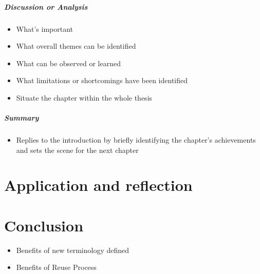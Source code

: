 \documentclass[dissertation]{softeng}
\begin{document}
\paragraph{Discussion or Analysis}
\begin{itemize}
\item What's important
\item What overall themes can be identified
\item What can be observed or learned
\item What limitations or shortcomings have been identified
\item Situate the chapter within the whole thesis
\end{itemize}
\paragraph{Summary}
\begin{itemize}
\item Replies to the introduction by briefly identifying the chapter's achievements and sets the scene for the next chapter
\end{itemize}
\pagebreak

\chapter{Application and reflection}

\chapter{Conclusion}

\begin{itemize}

\item Benefits of new terminology defined ~\cite{Glinz:2007ehba}  
\item Benefits of Reuse Process~\cite{Leite:2005wpba}

\end{itemize}




\appendix
\end{document}
